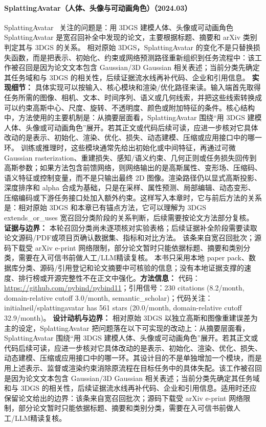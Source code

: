 \paragraph{SplattingAvatar（人体、头像与可动画角色）（2024.03）}
SplattingAvatar~\cite{2403_05087} 关注的问题是：用 3DGS 建模人体、头像或可动画角色 SplattingAvatar 是宽召回补全中发现的论文，主要根据标题、摘要和 arXiv 类别判定其与 3DGS 的关系。
相对原始 3DGS，SplattingAvatar 的变化不是只替换损失函数，而是把表示、初始化、约束或网络预测路径重新组织到任务流程中：该工作被召回是因为论文文本包含 Gaussian/3D Gaussian 相关表述；当前分类先确定其任务域和与 3DGS 的相关性，后续证据流水线再补代码、企业和引用信息。
\textbf{实现细节：} 具体实现可以按输入、核心模块和渲染/优化路径来读。输入端首先取得任务所需的图像、相机、文本、时间序列、语义或几何线索，并把这些线索转换成可以约束高斯中心、尺度、旋转、不透明度、颜色或附加特征的条件。核心结构中，方法使用的主要机制是：从摘要层面看，SplattingAvatar 围绕“用 3DGS 建模人体、头像或可动画角色”展开。若其正文或代码后续可读，应进一步核对它具体改动的是表示、初始化、渲染、优化、损失、动态建模、压缩或应用接口中的哪一环。 训练或推理时，这些模块通常先给出初始化或中间特征，再通过可微 Gaussian rasterization、重建损失、感知/语义约束、几何正则或任务损失回传到高斯参数；如果方法包含前馈网络，则网络输出的是高斯属性、变形场、压缩码、语义特征或控制变量，而不是只输出最终 2D 图像。渲染路径仍以显式高斯投影、深度排序和 alpha 合成为基础，只是在采样、属性预测、局部编辑、动态变形、压缩编码或下游任务接口处加入额外约束。这样写入本章时，它与前后方法的关系是：相对原始 3DGS 和本章已有锚点方法，它可以理解为 3DGS extends\_or\_uses 宽召回分类阶段的关系判断，后续需要按论文方法部分复核。
\textbf{证据与边界：} 本轮召回分类尚未逐项核对实验表格；后续证据补全阶段需要读取论文源码/PDF或项目页确认数据集、指标和对比方法。 该条来自宽召回批次；源码下载受 arXiv e-print 网络限制，部分论文暂时只能依据标题、摘要和类别分类，需要在入可信书前做人工/LLM精读复核。 本书只采用本地 paper pack、数据库分类、源码/引用登记和论文摘要中可核验的信息；没有本地证据支撑的速度、排行榜或开源完整性不在正文中强化。\textbf{方法信息：} 代码：\url{https://github.com/pybind/pybind11}；引用信号：230 citations (8.2/month, domain-relative cutoff 3.0/month, semantic\_scholar)；代码关注：initialneil/splattingavatar has 561 stars (20.0/month, domain-relative cutoff 32.9/month)。
\textbf{设计动机与边界：} 相对原始 3DGS 以独立高斯和图像重建误差为主的设定，SplattingAvatar 把问题落在以下可实现的改动上：从摘要层面看，SplattingAvatar 围绕“用 3DGS 建模人体、头像或可动画角色”展开。若其正文或代码后续可读，应进一步核对它具体改动的是表示、初始化、渲染、优化、损失、动态建模、压缩或应用接口中的哪一环。其设计目的不是单独增加一个模块，而是用上述表示、监督或渲染约束消除原流程在目标任务中的具体失配。该工作被召回是因为论文文本包含 Gaussian/3D Gaussian 相关表述；当前分类先确定其任务域和与 3DGS 的相关性，后续证据流水线再补代码、企业和引用信息。适用时还应保留论文给出的边界：该条来自宽召回批次；源码下载受 arXiv e-print 网络限制，部分论文暂时只能依据标题、摘要和类别分类，需要在入可信书前做人工/LLM精读复核。
